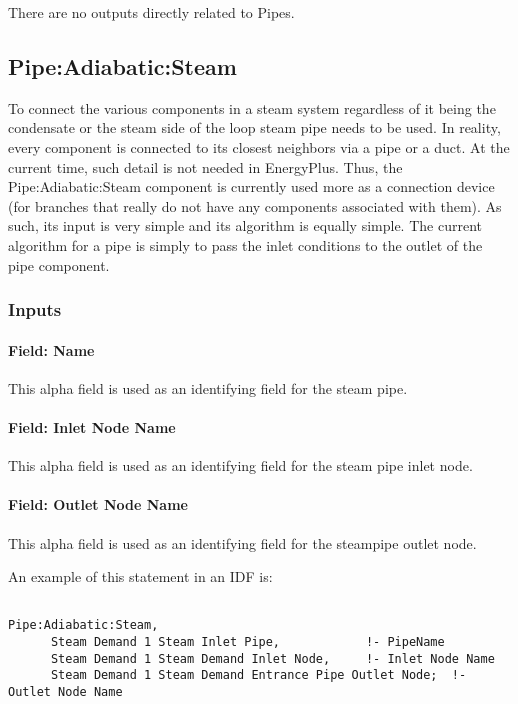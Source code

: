 There are no outputs directly related to Pipes.

\subsection{Pipe:Adiabatic:Steam}\label{pipeadiabaticsteam}

To connect the various components in a steam system regardless of it being the condensate or the steam side of the loop steam pipe needs to be used. In reality, every component is connected to its closest neighbors via a pipe or a duct. At the current time, such detail is not needed in EnergyPlus. Thus, the Pipe:Adiabatic:Steam component is currently used more as a connection device (for branches that really do not have any components associated with them). As such, its input is very simple and its algorithm is equally simple. The current algorithm for a pipe is simply to pass the inlet conditions to the outlet of the pipe component.

\subsubsection{Inputs}\label{inputs-5-017}

\paragraph{Field: Name}\label{field-name-5-013}

This alpha field is used as an identifying field for the steam pipe.

\paragraph{Field: Inlet Node Name}\label{field-inlet-node-name-1-000}

This alpha field is used as an identifying field for the steam pipe inlet node.

\paragraph{Field: Outlet Node Name}\label{field-outlet-node-name-1-001}

This alpha field is used as an identifying field for the steampipe outlet node.

An example of this statement in an IDF is:

\begin{lstlisting}

Pipe:Adiabatic:Steam,
      Steam Demand 1 Steam Inlet Pipe,            !- PipeName
      Steam Demand 1 Steam Demand Inlet Node,     !- Inlet Node Name
      Steam Demand 1 Steam Demand Entrance Pipe Outlet Node;  !- Outlet Node Name
\end{lstlisting}

